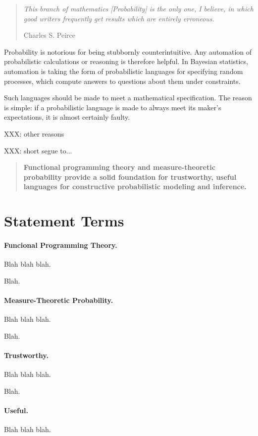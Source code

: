 \begin{quote}
\textit{This branch of mathematics [Probability] is the only one, I believe, in which good writers frequently get results which are entirely erroneous.}

\hfill Charles S. Peirce
\end{quote}

Probability is notorious for being stubbornly counterintuitive.
Any automation of probabilistic calculations or reasoning is therefore helpful.
In Bayesian statistics, automation is taking the form of probabilistic languages for specifying random processes, which compute answers to questions about them under constraints.

Such languages should be made to meet a mathematical specification.
The reason is simple: if a probabilistic language is made to always meet its maker's expectations, it is almost certainly faulty.

XXX: other reasons

XXX: short segue to...

\begin{quote}
\textbf{Functional programming theory and measure-theoretic probability provide a solid foundation for trustworthy, useful languages for constructive probabilistic modeling and inference.}
\end{quote}

\section{Statement Terms}

\paragraph{Funcional Programming Theory.} Blah blah blah.

Blah.

\paragraph{Measure-Theoretic Probability.} Blah blah blah.

Blah.

\paragraph{Trustworthy.} Blah blah blah.

Blah.

\paragraph{Useful.} Blah blah blah.

